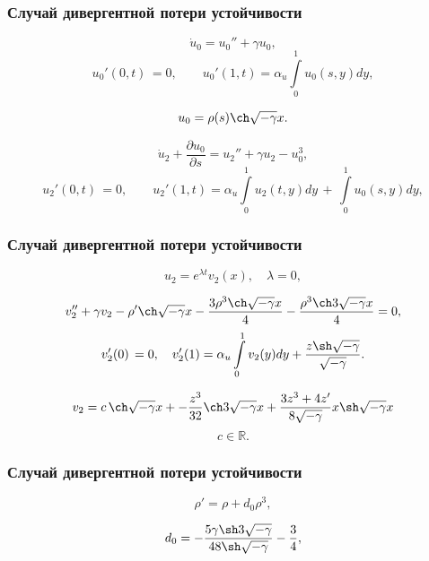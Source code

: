 \documentclass[fullscreen=true, unicode, bookmarks=false]{beamer}
\begin{document}
\begin{frame}
\frametitle{ Случай дивергентной потери устойчивости }

\begin{equation}
	\dot u_0 = u_0'' + \gamma u_0,
\end{equation}
\begin{equation}
	u_0'(0, t) \, = 0, \qquad u_0'(1, t) = \alpha_u\int\limits_{0}^{1} u_0(s, y) dy,
\end{equation}

$$ u_0 = \rho(s) \ch \sqrt{-\gamma} x. $$

\bigskip

\begin{equation}
	\dot u_2 + \frac{\partial u_0}{\partial s} = u_2'' + \gamma u_2 - u_0^3,
\end{equation}
\begin{equation}
	u_2'(0, t) \, = 0, \qquad u_2'(1, t) = \alpha_u\int\limits_{0}^{1} u_2(t, y) dy \, + \, \int\limits_{0}^{1} u_0(s, y) dy,
\end{equation}

\end{frame}

\begin{frame}
\frametitle{ Случай дивергентной потери устойчивости }

$$ u_2 = e^{\lambda t}v_2(x), \quad \lambda = 0, $$

\medskip
\pause

\begin{equation}
	v_2'' + \gamma v_2 - \rho' \ch \sqrt{-\gamma} x - \frac{3\rho^3\ch\sqrt{-\gamma}x}{4} - \frac{\rho^3\ch3\sqrt{-\gamma}x}{4} = 0,
\end{equation}
\begin{equation}
	v_2'(0) \, = 0, \quad v_2'(1) = \alpha_u\int\limits_{0}^{1} v_2(y) dy + \frac{z\sh\sqrt{-\gamma}}{\sqrt{-\gamma}}.
\end{equation}

\medskip
\pause

$$ v_2 = c\,\ch \sqrt{-\gamma} x + - \frac{z^3}{32}\ch3\sqrt{-\gamma}x + \frac{3z^3+4z'}{8\sqrt{-\gamma}}x\sh\sqrt{-\gamma}x $$
$$ c \in \mathbb{R}. $$

\end{frame}

\begin{frame}
\frametitle{ Случай дивергентной потери устойчивости }

\begin{equation}
	\rho' = \rho + d_0 \rho^3,
\end{equation}

\bigskip

$$ d_0 = -\frac{5\gamma\sh3\sqrt{-\gamma}}{48\sh\sqrt{-\gamma}} - \frac{3}{4}, $$

\end{frame}
\end{document}
